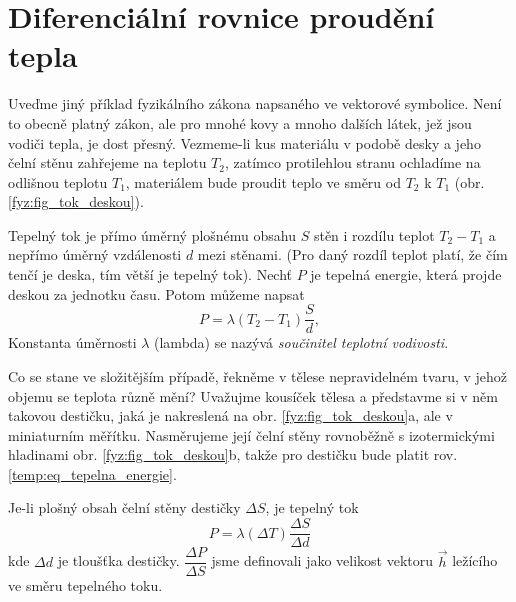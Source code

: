   \section{Diferenciální rovnice proudění tepla}
    \cite[s.~37]{Feynman02} Uveďme jiný příklad fyzikálního zákona napsaného ve vektorové symbolice. Není to 
    obecně platný zákon, ale pro mnohé kovy a mnoho dalších látek, jež jsou vodiči tepla, je dost přesný. 
    Vezmeme-li kus materiálu v podobě desky a jeho čelní stěnu zahřejeme na teplotu $T_2$, zatímco 
    protilehlou stranu ochladíme na odlišnou teplotu $T_1$, materiálem bude proudit teplo ve směru od $T_2$ 
    k $T_1$ (obr. \ref{fyz:fig_tok_deskou}).
    
    Tepelný tok je přímo úměrný plošnému obsahu $S$ stěn i rozdílu teplot $T_2-T_1$ a nepřímo úměrný 
    vzdálenosti $d$ mezi stěnami. (Pro daný rozdíl teplot platí, že čím tenčí je deska, tím větší je tepelný 
    tok). Nechť $P$ je tepelná energie, která projde deskou za jednotku času. Potom můžeme napsat
    \begin{equation}\label{temp:eq_tepelna_energie}
      P=\lambda(T_2-T_1)\frac{S}{d},
    \end{equation}
    Konstanta úměrnosti $\lambda$ (lambda) se nazývá \emph{součinitel teplotní vodivosti}.
    
    Co se stane ve složitějším případě, řekněme v tělese nepravidelném tvaru, v jehož objemu se teplota 
    různě mění? Uvažujme kousíček tělesa a představme si v něm takovou destičku, jaká je nakreslená na obr. 
    \ref{fyz:fig_tok_deskou}a, ale v miniaturním měřítku. Nasměrujeme její čelní stěny rovnoběžně s 
    izotermickými hladinami obr. \ref{fyz:fig_tok_deskou}b, takže pro destičku bude platit rov. 
    \ref{temp:eq_tepelna_energie}.            
    
    Je-li plošný obsah čelní stěny destičky $\Delta S$, je tepelný tok
    \begin{equation}\label{temp:eq_tepelna_energie_2}
      P=\lambda(\Delta T)\frac{\Delta S}{\Delta d}
    \end{equation}
    kde $\Delta d$ je tloušťka destičky. $\dfrac{\Delta P}{\Delta S}$ jsme definovali jako velikost
    vektoru $\vec{h}$ ležícího ve směru tepelného toku. 
    
